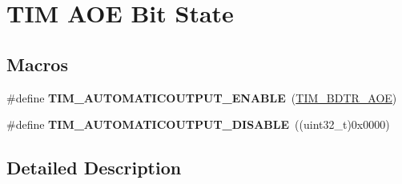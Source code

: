 \hypertarget{group___t_i_m___a_o_e___bit___set___reset}{}\section{T\+IM A\+OE Bit State}
\label{group___t_i_m___a_o_e___bit___set___reset}
\subsection*{Macros}
\begin{DoxyCompactItemize}
\item 
\#define {\bfseries T\+I\+M\+\_\+\+A\+U\+T\+O\+M\+A\+T\+I\+C\+O\+U\+T\+P\+U\+T\+\_\+\+E\+N\+A\+B\+LE}~(\hyperlink{group___peripheral___registers___bits___definition_ga59f15008050f91fa3ecc9eaaa971a509}{T\+I\+M\+\_\+\+B\+D\+T\+R\+\_\+\+A\+OE})\hypertarget{group___t_i_m___a_o_e___bit___set___reset_ga09e7f3f768b0f122f13fd47771f07ddf}{}\label{group___t_i_m___a_o_e___bit___set___reset_ga09e7f3f768b0f122f13fd47771f07ddf}

\item 
\#define {\bfseries T\+I\+M\+\_\+\+A\+U\+T\+O\+M\+A\+T\+I\+C\+O\+U\+T\+P\+U\+T\+\_\+\+D\+I\+S\+A\+B\+LE}~((uint32\+\_\+t)0x0000)\hypertarget{group___t_i_m___a_o_e___bit___set___reset_ga65b4336dee767fbe8d8cc4f980f6b18e}{}\label{group___t_i_m___a_o_e___bit___set___reset_ga65b4336dee767fbe8d8cc4f980f6b18e}

\end{DoxyCompactItemize}


\subsection{Detailed Description}
